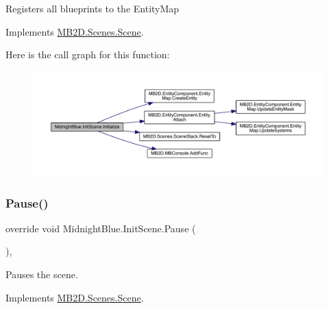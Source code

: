 Registers all blueprints to the Entity\+Map 



Implements \hyperlink{class_m_b2_d_1_1_scenes_1_1_scene_a081b4f8866936b495bdce388a7c96c25}{M\+B2\+D.\+Scenes.\+Scene}.

Here is the call graph for this function\+:
\nopagebreak
\begin{figure}[H]
\begin{center}
\leavevmode
\includegraphics[width=350pt]{class_midnight_blue_1_1_init_scene_a99eee8cc5dab8d7263591aeaa50144fb_cgraph}
\end{center}
\end{figure}
\hypertarget{class_midnight_blue_1_1_init_scene_adbcab013e715e5c49ad09bcd0545d994}{}\label{class_midnight_blue_1_1_init_scene_adbcab013e715e5c49ad09bcd0545d994} 
\subsubsection{\texorpdfstring{Pause()}{Pause()}}
{\footnotesize\ttfamily override void Midnight\+Blue.\+Init\+Scene.\+Pause (\begin{DoxyParamCaption}{ }\end{DoxyParamCaption})\hspace{0.3cm}{\ttfamily [inline]}, {\ttfamily [virtual]}}



Pauses the scene. 



Implements \hyperlink{class_m_b2_d_1_1_scenes_1_1_scene_a0661eff0223150fa8e9ea88145409e5d}{M\+B2\+D.\+Scenes.\+Scene}.

\hypertarget{class_midnight_blue_1_1_init_scene_a01ade76252a492d20181bd2e00eb217f}{}\label{class_midnight_blue_1_1_init_scene_a01ade76252a492d20181bd2e00eb217f} 
